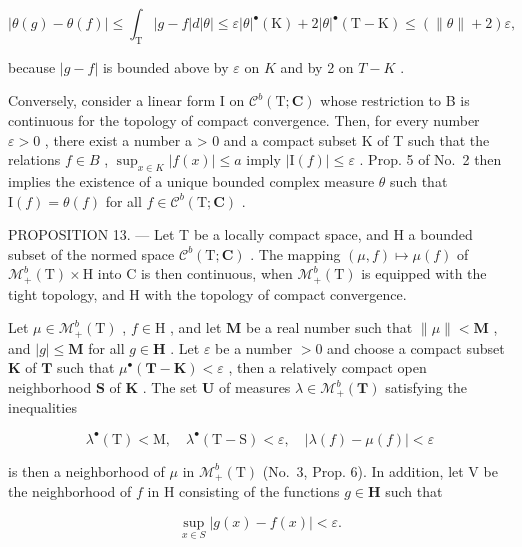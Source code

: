 \[
| \theta (g) - \theta (f) | \leqslant \int_ {\mathrm{T}} | g - f | d | \theta | \leqslant \varepsilon | \theta | ^ {\bullet} (\mathrm{K}) + 2 | \theta | ^ {\bullet} (\mathrm{T} - \mathrm{K}) \leqslant (\| \theta \| + 2) \varepsilon ,
\]

because \(|g - f|\) is bounded above by \(\varepsilon\) on \(K\) and by 2 on \(T - K\) .

Conversely, consider a linear form I on \(\mathcal{C}^{b}(\mathrm{T};\mathbf{C})\) whose restriction to B is continuous for the topology of compact convergence. Then, for every number \(\varepsilon > 0\) , there exist a number a \textgreater{} 0 and a compact subset K of T such that the relations \(f \in B\) , \(\sup_{x \in K} |f(x)| \leqslant a\) imply \(|\mathrm{I}(f)| \leqslant \varepsilon\) . Prop. 5 of No.~2 then implies the existence of a unique bounded complex measure \(\theta\) such that \(\mathrm{I}(f) = \theta(f)\) for all \(f \in \mathcal{C}^{b}(\mathrm{T};\mathbf{C})\) .

PROPOSITION 13. --- Let T be a locally compact space, and H a bounded subset of the normed space \(\mathcal{C}^{b}(\mathrm{T};\mathbf{C})\) . The mapping \((\mu,f)\mapsto\mu(f)\) of \(\mathcal{M}_{+}^{b}(\mathrm{T})\times\mathrm{H}\) into C is then continuous, when \(\mathcal{M}_{+}^{b}(\mathrm{T})\) is equipped with the tight topology, and H with the topology of compact convergence.

Let \(\mu \in \mathcal{M}_{+}^{b}(\mathrm{T})\) , \(f \in \mathrm{H}\) , and let \(\mathbf{M}\) be a real number such that \(\| \mu \| < \mathbf{M}\) , and \(|g| \leqslant \mathbf{M}\) for all \(g \in \mathbf{H}\) . Let \(\varepsilon\) be a number \(>0\) and choose a compact subset \(\mathbf{K}\) of \(\mathbf{T}\) such that \(\mu^{\bullet}(\mathbf{T} - \mathbf{K}) < \varepsilon\) , then a relatively compact open neighborhood \(\mathbf{S}\) of \(\mathbf{K}\) . The set \(\mathbf{U}\) of measures \(\lambda \in \mathcal{M}_{+}^{b}(\mathbf{T})\) satisfying the inequalities

\[
\lambda^ {\bullet} (\mathrm{T}) <   \mathrm{M}, \quad \lambda^ {\bullet} (\mathrm{T} - \mathrm{S}) <   \varepsilon , \quad | \lambda (f) - \mu (f) | <   \varepsilon
\]

is then a neighborhood of \(\mu\) in \(\mathcal{M}_+^b (\mathrm{T})\) (No.~3, Prop. 6). In addition, let V be the neighborhood of \(f\) in H consisting of the functions \(g\in \mathbf{H}\) such that

\[
\sup _ {x \in S} | g (x) - f (x) | <   \varepsilon .
\]

